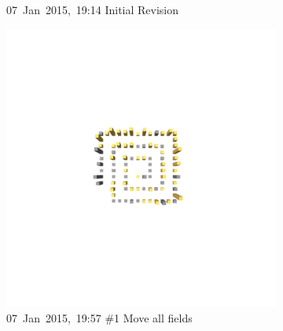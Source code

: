\begin{figure}[ht]
\begin{subfigure}{0.32\textwidth}
        \caption{\mbox{07 Jan 2015, 19:14}  \hfill  \linebreak  Initial Revision} 
        \label{fig:JetUML_V0S2}
    \end{subfigure}
    \hspace*{\fill}
    \begin{subfigure}{0.32\textwidth}
        \includegraphics[width=\linewidth]{JetUML_V0S3.png}
        \caption{\mbox{07 Jan 2015, 19:57}  \hfill  \linebreak  \#1 Move all fields} 
        \label{fig:JetUML_V0S3}
    \end{subfigure}
    \hspace*{\fill}
    \medskip
    \begin{subfigure}{0.32\textwidth}

\end{subfigure}
\end{figure}
